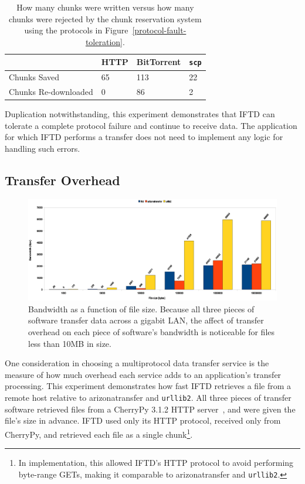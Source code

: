 \begin{table}[ht!]
\centering
\begin{tabular}{ | l | l | l | l | }
\hline
 & HTTP & BitTorrent & \texttt{scp} \\
\hline
Chunks Saved & 65 & 113 & 22 \\
Chunks Re-downloaded & 0 & 86 & 2 \\
\hline
\end{tabular}
\caption{How many chunks were written versus how many chunks were rejected by the chunk reservation system using the protocols in Figure~\ref{protocol-fault-toleration}.}
\label{protocol-effective-bandwidth}
\end{table}

Duplication notwithstanding, this experiment demonstrates that IFTD can tolerate a complete protocol failure and continue to receive data.  The application for which IFTD performs a transfer does not need to implement any logic for handling such errors.

\subsection{Transfer Overhead}

\begin{figure}[h!]
    \centering
    \includegraphics[width=1.0\textwidth]{diagrams/transfer-overhead}
    \caption{Bandwidth as a function of file size.  Because all three pieces of software transfer data across a gigabit LAN, the affect of transfer overhead on each piece of software's bandwidth is noticeable for files less than 10MB in size.}
    \label{transfer-overhead}
\end{figure}

One consideration in choosing a multiprotocol data transfer service is the measure of how much overhead each service adds to an application's transfer processing.  This experiment demonstrates how fast IFTD retrieves a file from a remote host relative to arizonatransfer and \texttt{urllib2}.  All three pieces of transfer software retrieved files from a CherryPy 3.1.2 HTTP server~\cite{cherrypy}, and were given the file's size in advance.  IFTD used only its HTTP protocol, received only from CherryPy, and retrieved each file as a single chunk\footnote[4]{In implementation, this allowed IFTD's HTTP protocol to avoid performing byte-range GETs, making it comparable to arizonatransfer and \texttt{urllib2}.}.

